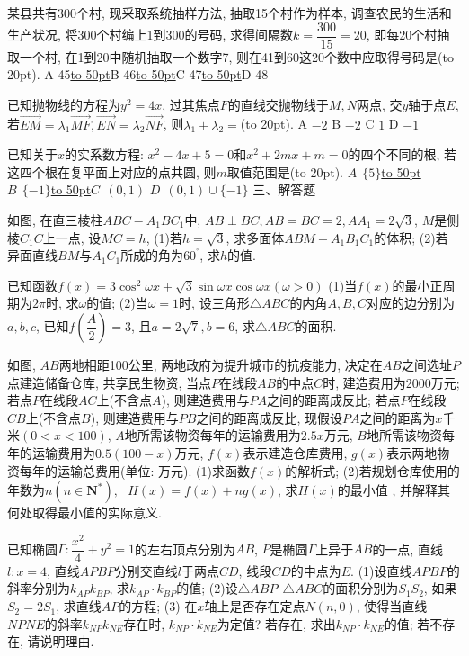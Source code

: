 \documentclass[10pt,a4paper]{article}
\newcommand{\blank}[1]{\underline{\hbox to #1pt{}}}
\newcommand{\bracket}[1]{(\hbox to #1pt{})}
\begin{document}
\item 某县共有300个村, 现采取系统抽样方法, 抽取15个村作为样本, 调查农民的生活和生产状况, 将300个村编上1到300的号码, 求得间隔数$k=\dfrac{300}{15}=20$, 即每20个村抽取一个村, 在1到20中随机抽取一个数字7, 则在41到60这20个数中应取得号码是\bracket{20}.
   A  45\blank{50}B  46\blank{50}C  47\blank{50}D  48
\item 已知抛物线的方程为$y^2=4x$, 过其焦点$F$的直线交抛物线于$M,N$两点, 交$y$轴于点$E$, 若$\overrightarrow{EM}=\lambda _1\overrightarrow{MF},\overrightarrow{EN}=\lambda _2\overrightarrow{NF}$, 则$\lambda _1+\lambda _2=$\bracket{20}.
 A  $-2$   B  $-2$   C  $1$    D  $-1$
\item 已知关于$x$的实系数方程: $x^2-4x+5=0$和$x^2+2mx+m=0$的四个不同的根, 若这四个根在复平面上对应的点共圆, 则$m$取值范围是\bracket{20}.
$A\ \ \{5\}$\blank{50}$B\ \ \{-1\}$\blank{50}$C\ \ (0,1)$    $D\ \ (0,1)\cup \{-1\}$
三、解答题
\item 如图, 在直三棱柱$ABC-A_1BC_1$中, $AB\perp BC,AB=BC=2,AA_1=2\sqrt 3$, $M$是侧棱$C_1C$上一点, 设$MC=h$,
(1)若$h=\sqrt 3$, 求多面体$ABM-A_1B_1C_1$的体积;
(2)若异面直线$BM$与$A_1C_1$所成的角为$60^{^\circ }$, 求$h$的值.
\item 已知函数$f(x)=3\cos ^2\omega x+\sqrt 3\sin \omega x\cos \omega x(\omega >0)$
(1)当$f(x)$的最小正周期为$2\pi$时, 求$\omega$的值;
(2)当$\omega =1$时, 设三角形$\triangle ABC$的内角$A,B,C$对应的边分别为$a,b,c$, 已知$f(\dfrac A2)=3$, 且$a=2\sqrt 7,b=6$, 求$\triangle ABC$的面积.
\item 如图, $AB$两地相距100公里, 两地政府为提升城市的抗疫能力, 决定在$AB$之间选址$P$点建造储备仓库, 共享民生物资, 当点$P$在线段$AB$的中点$C$时, 建造费用为2000万元; 若点$P$在线段$AC$上(不含点$A$), 则建造费用与$PA$之间的距离成反比; 若点$P$在线段$CB$上(不含点$B$), 则建造费用与$PB$之间的距离成反比, 现假设$PA$之间的距离为$x$千米$(0<x<100)$, $A$地所需该物资每年的运输费用为$2.5x$万元, $B$地所需该物资每年的运输费用为$0.5(100-x)$万元, $f(x)$表示建造仓库费用, $g(x)$表示两地物资每年的运输总费用(单位: 万元).
(1)求函数$f(x)$的解析式;
(2)若规划仓库使用的年数为$n(n\in \mathbf{N}^*),\ \ \ H(x)=f(x)+ng(x)$, 求$H(x)$的最小值 , 并解释其何处取得最小值的实际意义.
\item 已知椭圆$\Gamma :\dfrac{x^2}4+y^2=1$的左右顶点分别为$AB$, $P$是椭圆$\Gamma$上异于$AB$的一点, 直线$l:x=4$, 直线$APBP$分别交直线$l$于两点$CD$, 线段$CD$的中点为$E$.
(1)设直线$APBP$的斜率分别为$k_{AP}k_{BP}$, 求$k_{AP}\cdot k_{BP}$的值;
(2)设$\triangle ABP\ \ \triangle ABC$的面积分别为$S_1S_2$, 如果$S_2=2S_1$, 求直线$AP$的方程;
(3) 在$x$轴上是否存在定点$N(n,0)$, 使得当直线$NPNE$的斜率$k_{NP}k_{NE}$存在时, $k_{NP}\cdot k_{NE}$为定值? 若存在, 求出$k_{NP}\cdot k_{NE}$的值; 若不存在, 请说明理由.
\end{document}
